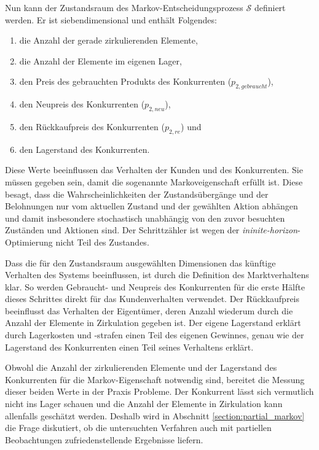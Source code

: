 Nun kann der Zustandsraum des Markov-Entscheidungsprozess $\mathcal{S}$ definiert werden.
Er ist siebendimensional und enthält Folgendes:
\begin{enumerate}
	\item die Anzahl der gerade zirkulierenden Elemente,
	\item die Anzahl der Elemente im eigenen Lager,
	\item den Preis des gebrauchten Produkts des Konkurrenten ($p_{2, gebraucht}$),
	\item den Neupreis des Konkurrenten ($p_{2, neu}$),
	\item den Rückkaufpreis des Konkurrenten ($p_{2, re}$) und
	\item den Lagerstand des Konkurrenten.
\end{enumerate}
Diese Werte beeinflussen das Verhalten der Kunden und des Konkurrenten.
Sie müssen gegeben sein, damit die sogenannte Markoveigenschaft erfüllt ist.
Diese besagt, dass die Wahrscheinlichkeiten der Zustandsübergänge und der Belohnungen nur vom aktuellen Zustand und der gewählten Aktion abhängen und damit insbesondere stochastisch unabhängig von den zuvor besuchten Zuständen und Aktionen sind.
Der Schrittzähler ist wegen der \textit{ininite-horizon}-Optimierung nicht Teil des Zustandes.

Dass die für den Zustandsraum ausgewählten Dimensionen das künftige Verhalten des Systems beeinflussen, ist durch die Definition des Marktverhaltens klar.
So werden Gebraucht- und Neupreis des Konkurrenten für die erste Hälfte dieses Schrittes direkt für das Kundenverhalten verwendet.
Der Rückkaufpreis beeinflusst das Verhalten der Eigentümer, deren Anzahl wiederum durch die Anzahl der Elemente in Zirkulation gegeben ist.
Der eigene Lagerstand erklärt durch Lagerkosten und -strafen einen Teil des eigenen Gewinnes, genau wie der Lagerstand des Konkurrenten einen Teil seines Verhaltens erklärt.

Obwohl die Anzahl der zirkulierenden Elemente und der Lagerstand des Konkurrenten für die Markov-Eigenschaft notwendig sind, bereitet die Messung dieser beiden Werte in der Praxis Probleme.
Der Konkurrent lässt sich vermutlich nicht ins Lager schauen und die Anzahl der Elemente in Zirkulation kann allenfalls geschätzt werden.
Deshalb wird in Abschnitt \ref{section:partial_markov} die Frage diskutiert, ob die untersuchten Verfahren auch mit partiellen Beobachtungen zufriedenstellende Ergebnisse liefern.

